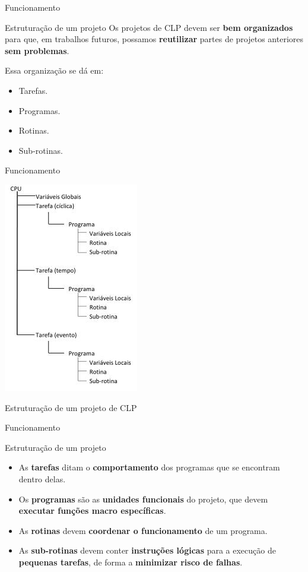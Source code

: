 \begin{frame}{Funcionamento}
	\begin{block}{Estruturação de um projeto}
		Os projetos de CLP devem ser \textbf{bem organizados} para que, em trabalhos futuros, possamos \textbf{reutilizar} partes de projetos anteriores \textbf{sem problemas}.
		
		\smallskip
		
		Essa organização se dá em:
		\begin{itemize}
			\item Tarefas.
			\item Programas.
			\item Rotinas.
			\item Sub-rotinas.
		\end{itemize}
	\end{block}
\end{frame}


\begin{frame}{Funcionamento}
	\centering
	
	\includegraphics[height=0.8\textheight]{Figuras/Ch09/fig5}
	
	Estruturação de um projeto de CLP
\end{frame}


\begin{frame}{Funcionamento}
	\begin{block}{Estruturação de um projeto}
		\begin{itemize}
			\item As \textbf{tarefas} ditam o \textbf{comportamento} dos programas que se encontram dentro delas.
			\item Os \textbf{programas} são as \textbf{unidades funcionais} do projeto, que devem \textbf{executar funções macro específicas}.
			\item As \textbf{rotinas} devem \textbf{coordenar o funcionamento} de um programa.
			\item As \textbf{sub-rotinas} devem conter \textbf{instruções lógicas} para a execução de \textbf{pequenas tarefas}, de forma a \textbf{minimizar risco de falhas}.
		\end{itemize}
	\end{block}
\end{frame}


